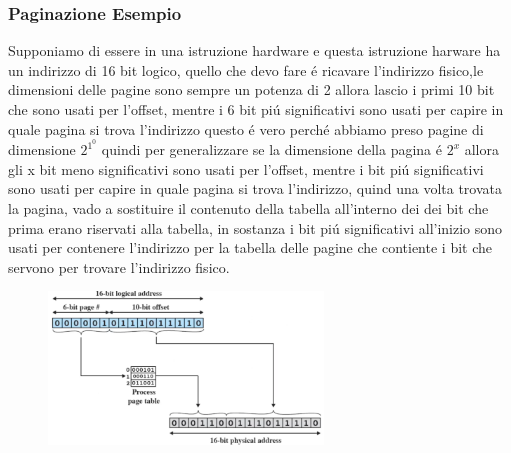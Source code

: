     \subsubsection*{Paginazione Esempio}
    Supponiamo di essere in una istruzione hardware e questa istruzione harware ha un indirizzo di 16 bit logico,
    quello che devo fare é ricavare l'indirizzo fisico,le dimensioni delle pagine sono sempre un potenza di 2
    allora lascio i primi 10 bit che sono usati per l'offset, mentre i 6 bit piú significativi sono usati per
    capire in quale pagina si trova l'indirizzo questo é vero perché abbiamo preso pagine di dimensione \begin{math}2^1^0\end{math}
    quindi per generalizzare se la dimensione della pagina é \begin{math}2^x\end{math} allora gli x bit meno significativi sono usati
    per l'offset, mentre i bit piú significativi sono usati per capire in quale pagina si trova l'indirizzo, quind una
    volta trovata la pagina, vado a sostituire il contenuto della tabella all'interno dei dei bit che prima erano
    riservati alla tabella, in sostanza i bit piú significativi all'inizio sono usati per contenere l'indirizzo per la
    tabella delle pagine che contiente i bit che servono per trovare l'indirizzo fisico.
    \begin{figure}[H]
        \centering
        \includegraphics[width=0.65\textwidth]{immagini/funzionamentopaginazione1}
        \caption{}
        \label{fig:funzionamentopaginazione1}
    \end{figure}
